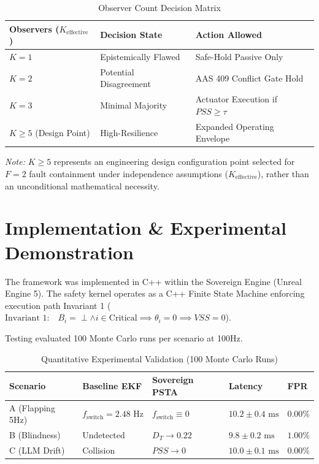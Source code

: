 \documentclass[conference]{IEEEtran}
\begin{document}
\begin{table}[htbp]
\caption{Observer Count Decision Matrix}
\begin{center}
\begin{tabular}{lll}
\toprule
\textbf{Observers ($K_{\text{effective}}$)} & \textbf{Decision State} & \textbf{Action Allowed} \\
\midrule
$K = 1$ & Epistemically Flawed & Safe-Hold Passive Only \\
$K = 2$ & Potential Disagreement & AAS 409 Conflict Gate Hold \\
$K = 3$ & Minimal Majority & Actuator Execution if $PSS \ge \tau$ \\
$K \ge 5$ (Design Point) & High-Resilience & Expanded Operating Envelope \\
\bottomrule
\end{tabular}
\label{tab:observer_matrix}
\end{center}
\end{table}
\textit{Note:} $K \ge 5$ represents an engineering design configuration point selected for $F=2$ fault containment under independence assumptions ($K_{\text{effective}}$), rather than an unconditional mathematical necessity.

\section{Implementation \& Experimental Demonstration}

The framework was implemented in C++ within the Sovereign Engine (Unreal Engine 5). The safety kernel operates as a C++ Finite State Machine enforcing execution path Invariant 1 ($\text{Invariant 1:} \quad B_i = \perp \land i \in \text{Critical} \implies \theta_i = 0 \implies VSS = 0$).

Testing evaluated 100 Monte Carlo runs per scenario at 100Hz.

\begin{table}[htbp]
\caption{Quantitative Experimental Validation (100 Monte Carlo Runs)}
\begin{center}
\begin{tabular}{lllll}
\toprule
\textbf{Scenario} & \textbf{Baseline EKF} & \textbf{Sovereign PSTA} & \textbf{Latency} & \textbf{FPR} \\
\midrule
A (Flapping 5Hz) & $f_{\text{switch}} = 2.48\text{ Hz}$ & $f_{\text{switch}} \equiv 0$ & $10.2 \pm 0.4\text{ ms}$ & $0.00\%$ \\
B (Blindness) & Undetected & $D_T \to 0.22$ & $9.8 \pm 0.2\text{ ms}$ & $1.00\%$ \\
C (LLM Drift) & Collision & $PSS \to 0$ & $10.0 \pm 0.1\text{ ms}$ & $0.00\%$ \\
\bottomrule
\end{tabular}
\label{tab:validation_results}
\end{center}
\end{table}
\end{document}
